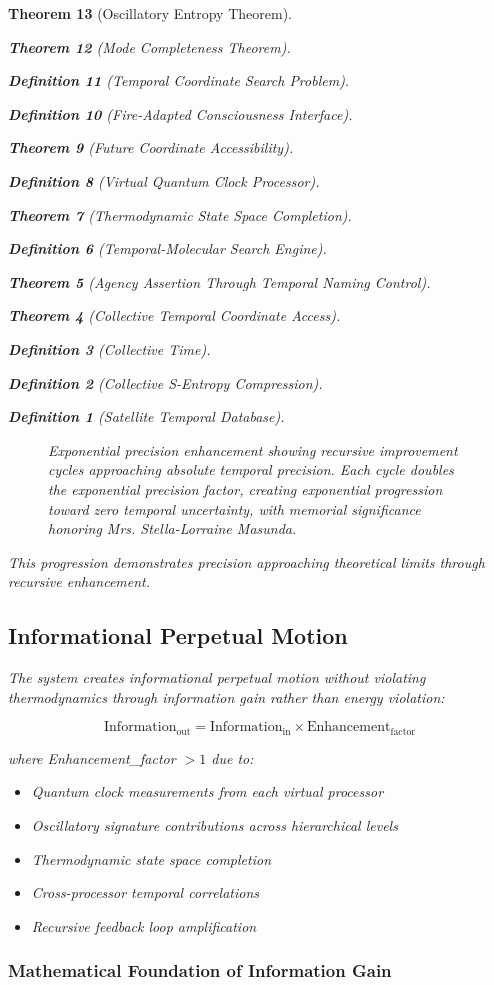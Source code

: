 \documentclass[12pt,a4paper]{article}
\newtheorem{theorem}{Theorem}[section]
\newtheorem{definition}[theorem]{Definition}
\begin{document}
\begin{theorem}[Oscillatory Entropy Theorem]
\begin{theorem}[Mode Completeness Theorem]
\begin{enumerate}
\begin{definition}[Temporal Coordinate Search Problem]
\begin{algorithm}
\begin{definition}[Fire-Adapted Consciousness Interface]
\begin{theorem}[Future Coordinate Accessibility]
\begin{definition}[Virtual Quantum Clock Processor]
\begin{itemize}
\begin{itemize}
\begin{theorem}[Thermodynamic State Space Completion]
\begin{definition}[Temporal-Molecular Search Engine]
\begin{theorem}[Agency Assertion Through Temporal Naming Control]
\begin{remark}
\begin{theorem}[Collective Temporal Coordinate Access]
\begin{definition}[Collective Time]
\begin{definition}[Collective S-Entropy Compression]
\begin{definition}[Satellite Temporal Database]
\begin{algorithm}
\begin{table}[h]
{\begin{figure}[H]
\begin{tikzpicture}[scale=0.8]
\end{tikzpicture}
\caption{Exponential precision enhancement showing recursive improvement cycles approaching absolute temporal precision. Each cycle doubles the exponential precision factor, creating exponential progression toward zero temporal uncertainty, with memorial significance honoring Mrs. Stella-Lorraine Masunda.}
\label{fig:exponential_precision}
\end{figure}

This progression demonstrates precision approaching theoretical limits through recursive enhancement.

\subsection{Informational Perpetual Motion}

The system creates informational perpetual motion without violating thermodynamics through information gain rather than energy violation:

\begin{equation}
\text{Information}_{\text{out}} = \text{Information}_{\text{in}} \times \text{Enhancement}_{\text{factor}}
\end{equation}

where Enhancement\_factor $> 1$ due to:
\begin{itemize}
\item Quantum clock measurements from each virtual processor
\item Oscillatory signature contributions across hierarchical levels
\item Thermodynamic state space completion
\item Cross-processor temporal correlations
\item Recursive feedback loop amplification
\end{itemize}

\subsubsection{Mathematical Foundation of Information Gain}

}
\end{table}
\end{algorithm}
\end{definition}
\end{definition}
\end{definition}
\end{theorem}
\end{remark}
\end{theorem}
\end{definition}
\end{theorem}
\end{itemize}
\end{itemize}
\end{definition}
\end{theorem}
\end{definition}
\end{algorithm}
\end{definition}
\end{enumerate}
\end{theorem}
\end{theorem}
\end{document}
